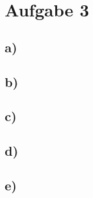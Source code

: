 \section*{Aufgabe 3}

\subsection*{a)}

\subsection*{b)}

\subsection*{c)}

\subsection*{d)}

\subsection*{e)}